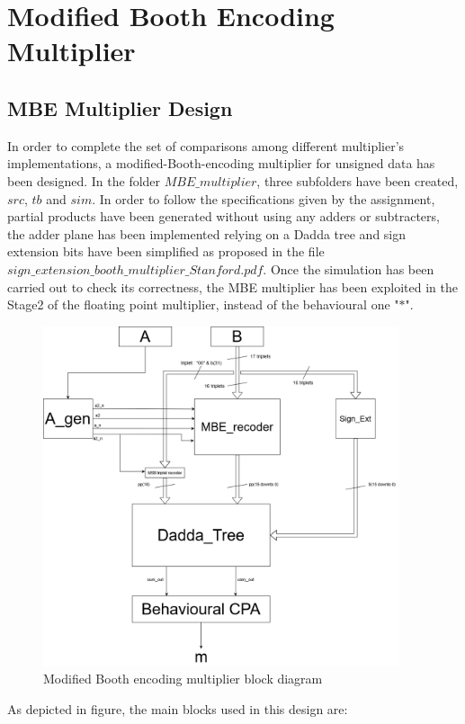\chapter{Modified Booth Encoding Multiplier}
\label{chap2}


\section{MBE Multiplier Design}
In order to complete the set of comparisons among different multiplier's implementations,
a modified-Booth-encoding multiplier for unsigned data has been designed. In the folder $MBE\_multiplier$, three subfolders
have been created, $src$, $tb$ and $sim$.
In order to follow the specifications given by the assignment, partial products have been
generated without using any adders or subtracters, the adder plane has been implemented
relying on a Dadda tree and sign extension bits have been simplified as proposed in the
file $sign\_extension\_booth\_multiplier\_Stanford.pdf$. Once the simulation has been carried
out to check its correctness, the MBE multiplier has been exploited in the Stage2 of the
floating point multiplier, instead of the behavioural one "$*$".

\begin{figure}[H]
	\centering
	\includegraphics[width=\textwidth , height=10cm]{img/MBE_Mult.png} 
	\caption{Modified Booth encoding multiplier block diagram}
	\label{Modified Booth encoding multiplier block diagram} 
\end{figure}

As depicted in figure, the main blocks used in this design are:

